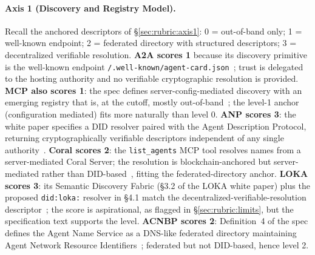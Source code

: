 \paragraph{Axis 1 (Discovery and Registry Model).}
Recall the anchored descriptors of \S\ref{sec:rubric:axis1}:
0 = out-of-band only; 1 = well-known endpoint; 2 =
federated directory with structured descriptors; 3 =
decentralized verifiable resolution. \textbf{A2A scores 1}
because its discovery primitive is the well-known endpoint
\texttt{/.well-known/agent-card.json}~\cite{spec_a2a};
trust is delegated to the hosting authority and no
verifiable cryptographic resolution is provided.
\textbf{MCP also scores 1}: the spec defines
server-config-mediated discovery with an emerging registry
that is, at the cutoff, mostly out-of-band~\cite{spec_mcp};
the level-1 anchor (configuration mediated) fits more
naturally than level 0. \textbf{ANP scores 3}: the white
paper specifies a DID resolver paired with the Agent
Description Protocol, returning cryptographically
verifiable descriptors independent of any single
authority~\cite{spec_anp}. \textbf{Coral scores 2}: the
\texttt{list\_agents} MCP tool resolves names from a
server-mediated Coral Server; the resolution is
blockchain-anchored but server-mediated rather than
DID-based~\cite{spec_coral}, fitting the federated-directory
anchor. \textbf{LOKA scores 3}: its Semantic Discovery
Fabric (\S3.2 of the LOKA white paper) plus the proposed
\texttt{did:loka:} resolver in \S4.1 match the
decentralized-verifiable-resolution descriptor~\cite{spec_loka};
the score is aspirational, as flagged in
\S\ref{sec:rubric:limits}, but the specification text
supports the level. \textbf{ACNBP scores 2}: Definition~4
of the spec defines the Agent Name Service as a
DNS-like federated directory maintaining Agent Network
Resource Identifiers~\cite{spec_acnbp}; federated but not
DID-based, hence level 2.

